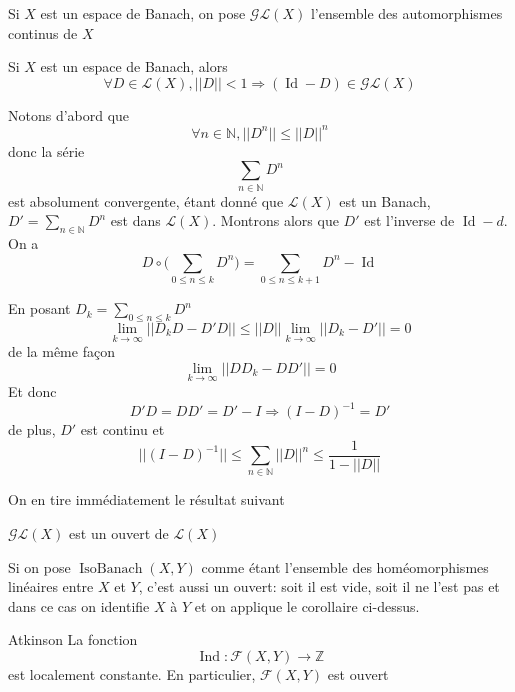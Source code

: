 \documentclass[memoire.tex]{subfiles}
\begin{document}
Si $X$ est un espace de Banach, on pose $\mathcal{GL}(X)$ l'ensemble des automorphismes continus de $X$
\begin{lemme}
    Si $X$ est un espace de Banach, alors 
    \begin{equation*}
        \forall D\in\mathcal{L}(X), ||D||< 1 \Rightarrow (\operatorname*{Id}-D)\in\mathcal{GL}(X)
    \end{equation*}
\end{lemme}
\begin{preuve}
    Notons d'abord que 
    \begin{equation*}
        \forall n\in\mathbb{N}, ||D^n||\leq ||D||^n 
    \end{equation*}
    donc la série
    \begin{equation*}
        \sum_{n\in\mathbb{N}} D^n
    \end{equation*}
    est absolument convergente, étant donné que $\mathcal{L}(X)$ est un Banach, $D'=\sum_{n\in\mathbb{N}} D^n$ est dans $\mathcal{L}(X)$. 
    Montrons alors que $D'$ est l'inverse de $\operatorname{Id} -d$.
    On a
    \begin{equation*}
        D\circ\big( \sum_{0\leq n\leq k} D^n\big)= \sum_{0\leq n\leq k+1} D^n- \operatorname{Id}
    \end{equation*}

    En posant $D_k=\sum_{0\leq n\leq k} D^n$
    \begin{equation*}
        \lim_{k\rightarrow \infty} ||D_kD -D'D||\leq 
        ||D||\lim_{k\rightarrow \infty}  ||D_k-D'||=0
    \end{equation*}
    de la même façon 
    \begin{equation*}
        \lim_{k\rightarrow \infty} ||DD_k -DD'||=0
    \end{equation*}
    Et donc
    \begin{equation*}
        D'D=DD'=D'-I\Rightarrow (I-D)^{-1}=D'
    \end{equation*}
    de plus, $D'$ est continu et
    \begin{equation*}
        ||(I-D)^{-1}||\leq \sum_{n\in\mathbb{N}} ||D||^n \leq  \frac{1}{1-||D||}
    \end{equation*}
\end{preuve}
On en tire immédiatement le résultat suivant
\begin{corollaire}\label{iso-ouverts}
    $\mathcal{GL}(X)$ est un ouvert de $\mathcal{L}(X)$
\end{corollaire}
Si on pose $\operatorname*{IsoBanach}(X,Y)$ comme étant l'ensemble des homéomorphismes linéaires entre $X$ et $Y$, c'est aussi un ouvert: soit il est vide, soit il ne l'est pas et dans ce cas on identifie $X$ à $Y$ et on applique le corollaire ci-dessus.
\begin{theobox}{Atkinson}{}\label{Atkinson}
    La fonction 
    \begin{equation*}
        \operatorname{Ind}: \mathcal{F}(X,Y)\rightarrow \mathbb{Z}
    \end{equation*}
    est localement constante. En particulier, $\mathcal{F}(X,Y)$ est ouvert
\end{theobox}
\end{document}
